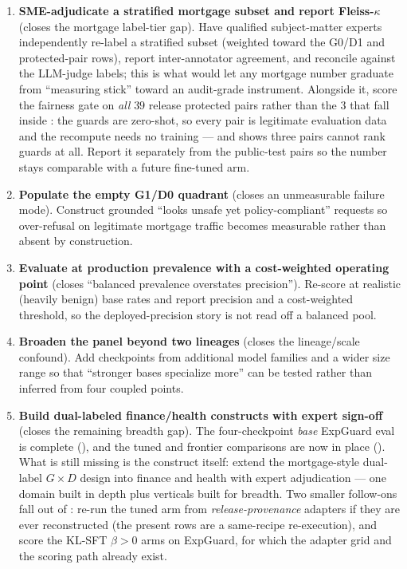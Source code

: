 \begin{enumerate}[leftmargin=1.9em,itemsep=3pt]
  \item \textbf{SME-adjudicate a stratified mortgage subset and report Fleiss-$\kappa$} (closes the mortgage label-tier gap). Have qualified subject-matter experts independently re-label a stratified subset (weighted toward the G0/D1 and protected-pair rows), report inter-annotator agreement, and reconcile against the LLM-judge labels; this is what would let any mortgage number graduate from ``measuring stick'' toward an audit-grade instrument. Alongside it, score the fairness gate on \emph{all} $39$ release protected pairs rather than the $3$ that fall inside : the guards are zero-shot, so every pair is legitimate evaluation data and the recompute needs no training --- and  shows three pairs cannot rank guards at all. Report it separately from the public-test pairs so the number stays comparable with a future fine-tuned arm.
  \item \textbf{Populate the empty G1/D0 quadrant} (closes an unmeasurable failure mode). Construct grounded ``looks unsafe yet policy-compliant'' requests so over-refusal on legitimate mortgage traffic becomes measurable rather than absent by construction.
  \item \textbf{Evaluate at production prevalence with a cost-weighted operating point} (closes ``balanced prevalence overstates precision''). Re-score at realistic (heavily benign) base rates and report precision and a cost-weighted threshold, so the deployed-precision story is not read off a balanced pool.
  \item \textbf{Broaden the panel beyond two lineages} (closes the lineage/scale confound). Add checkpoints from additional model families and a wider size range so that ``stronger bases specialize more'' can be tested rather than inferred from four coupled points.
  \item \textbf{Build dual-labeled finance/health constructs with expert sign-off} (closes the remaining breadth gap). The four-checkpoint \emph{base} ExpGuard eval is complete (), and the tuned and frontier comparisons are now in place (). What is still missing is the construct itself: extend the mortgage-style dual-label $G\times D$ design into finance and health with expert adjudication --- one domain built in depth plus verticals built for breadth. Two smaller follow-ons fall out of : re-run the tuned arm from \emph{release-provenance} adapters if they are ever reconstructed (the present rows are a same-recipe re-execution), and score the KL-SFT $\beta>0$ arms on ExpGuard, for which the adapter grid and the scoring path already exist.

\end{enumerate}
